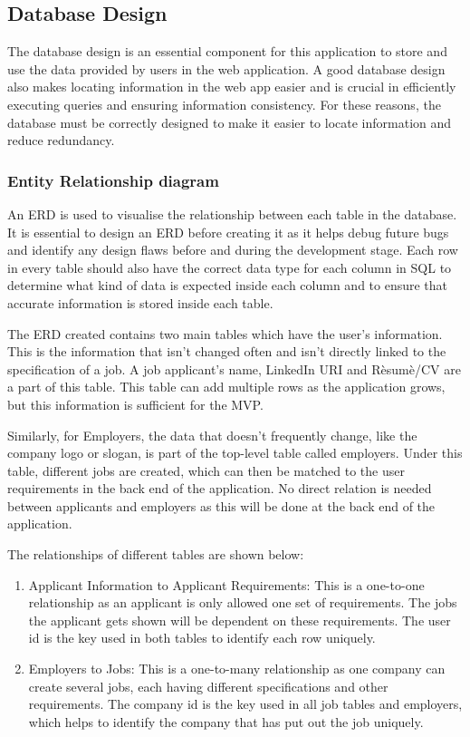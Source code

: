 \subsection{Database Design}
The database design is an essential component for this application to store and use the data provided by users in the web application. A good database design also makes locating information in the web app easier and is crucial in efficiently executing queries and ensuring information consistency. For these reasons, the database must be correctly designed to make it easier to locate information and reduce redundancy.

\subsubsection{Entity Relationship diagram}
An ERD is used to visualise the relationship between each table in the database. It is essential to design an ERD before creating it as it helps debug future bugs and identify any design flaws before and during the development stage. Each row in every table should also have the correct data type for each column in SQL to determine what kind of data is expected inside each column and to ensure that accurate information is stored inside each table.

The ERD created contains two main tables which have the user's information. This is the information that isn't changed often and isn't directly linked to the specification of a job. A job applicant's name, LinkedIn URI and Rèsumè/CV are a part of this table. This table can add multiple rows as the application grows, but this information is sufficient for the MVP. 

Similarly, for Employers, the data that doesn't frequently change, like the company logo or slogan, is part of the top-level table called employers. Under this table, different jobs are created, which can then be matched to the user requirements in the back end of the application. No direct relation is needed between applicants and employers as this will be done at the back end of the application.

The relationships of different tables are shown below:
\begin{enumerate}
    \item Applicant Information to Applicant Requirements: This is a one-to-one relationship as an applicant is only allowed one set of requirements. The jobs the applicant gets shown will be dependent on these requirements. The user id is the key used in both tables to identify each row uniquely.
    \item Employers to Jobs: This is a one-to-many relationship as one company can create several jobs, each having different specifications and other requirements. The company id is the key used in all job tables and employers, which helps to identify the company that has put out the job uniquely.
\end{enumerate}


